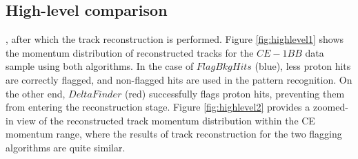 \subsection{High-level comparison}
,
%
after which the track reconstruction is performed. 
Figure \ref{fig:highlevel1} shows the momentum 
distribution of reconstructed tracks for the $CE-1BB$ 
data sample using both algorithms. 
In the case of $FlagBkgHits$ (blue), less proton hits are  
correctly flagged, and non-flagged hits are
used in the pattern recognition. 
On the other end, $DeltaFinder$ (red) successfully flags 
proton hits, preventing them from entering the reconstruction stage. 
Figure \ref{fig:highlevel2} provides a zoomed-in view 
of the reconstructed track momentum distribution within 
the CE momentum range, where the results of track reconstruction 
for the two flagging algorithms are quite similar.

